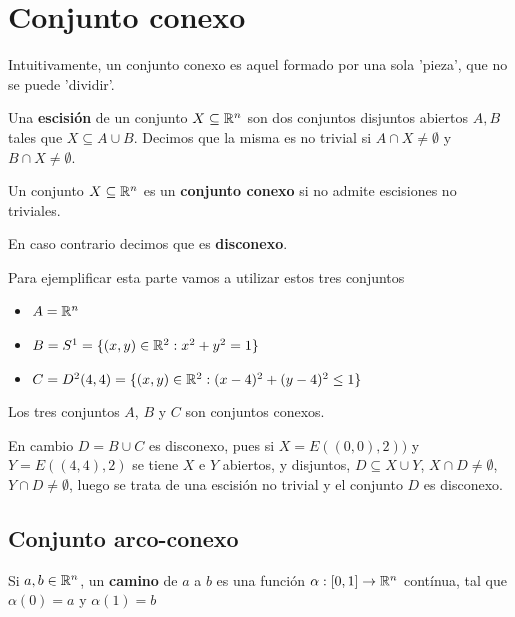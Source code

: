 \section{Conjunto conexo}

Intuitivamente, un conjunto conexo es aquel formado por una sola 'pieza', que no se puede 'dividir'.

\begin{definition}[Conexo]
Una \textbf{escisión} de un conjunto $X \subseteq \mathbb{R}^n$ son dos conjuntos disjuntos abiertos $A,B$ tales que $ X \subseteq A \cup B$.  Decimos que la misma es no trivial si $A \cap X \neq \emptyset$ y $B \cap X \neq \emptyset$.

Un conjunto $ X \subseteq \mathbb{R}^n$ es un \textbf{conjunto conexo}  si no admite escisiones no triviales.  

En caso contrario decimos que es \textbf{disconexo}.
\end{definition}

\begin{example}
Para ejemplificar esta parte vamos a utilizar estos tres conjuntos

\begin{itemize}
\item $ A = \mathbb{R}^n $

\item $ B = S^1 = \{ (x,y) \in \mathbb{R}^2 : x^2 + y^2 = 1\}$

\item $ C = D^2(4,4) = \{ (x,y) \in \mathbb{R}^2 : (x-4)^2 + (y-4)^2 \leq 1 \}$ 
\end{itemize}

Los tres conjuntos $A$, $B$ y $C$ son conjuntos conexos.

En cambio $D = B \cup C$ es disconexo, pues si $X = E((0,0),2))$ y $Y=E((4,4), 2)$ se tiene $X$ e $Y$ abiertos, y disjuntos, $ D \subseteq X \cup Y$, $X \cap D \neq \emptyset$, $Y \cap D \neq \emptyset$, luego se trata de una escisión no trivial y el conjunto $D$ es disconexo.
\end{example}

\subsection{Conjunto arco-conexo}

\begin{definition}[Camino]
Si $a,b \in \mathbb{R}^n$, un \textbf{camino} de $a$ a $b$ es una función $ \alpha : [0,1] \to \mathbb{R}^n$ contínua, tal que $\alpha(0) = a$ y $\alpha(1) = b$
\end{definition}


